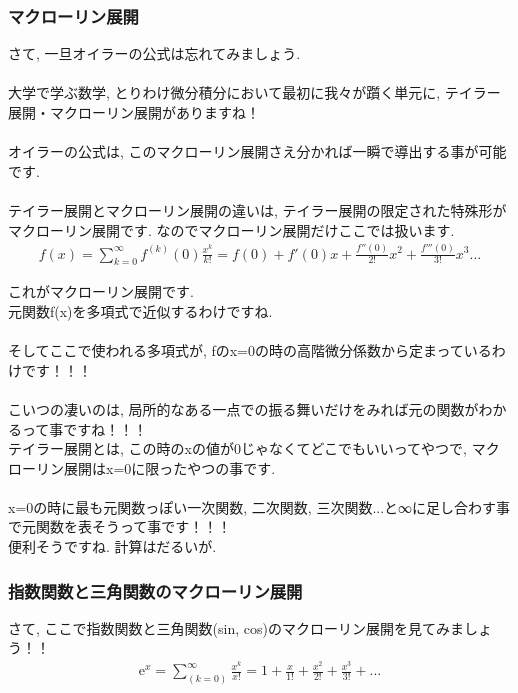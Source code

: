 \documentclass[11pt,a4paper]{jsarticle}
\begin{document}
\subsubsection{マクローリン展開}
さて, 一旦オイラーの公式は忘れてみましょう.\\
\\
大学で学ぶ数学, とりわけ微分積分において最初に我々が躓く単元に, テイラー展開・マクローリン展開がありますね！\\
\\
オイラーの公式は, このマクローリン展開さえ分かれば一瞬で導出する事が可能です.\\
\\
テイラー展開とマクローリン展開の違いは, テイラー展開の限定された特殊形がマクローリン展開です. なのでマクローリン展開だけここでは扱います.\\
\begin{eqnarray}
f(x) = \sum_{k=0}^\infty f^{(k)} (0) \frac{x^k}{k!} = f(0) + f'(0)x + \frac{f''(0)}{2!}x^2 + \frac{f'''(0)}{3!}x^3 ...
\end{eqnarray}

これがマクローリン展開です.\\
元関数f(x)を多項式で近似するわけですね.\\
\\
そしてここで使われる多項式が, fのx=0の時の高階微分係数から定まっているわけです！！！\\
\\
こいつの凄いのは, 局所的なある一点での振る舞いだけをみれば元の関数がわかるって事ですね！！！\\
テイラー展開とは, この時のxの値が0じゃなくてどこでもいいってやつで, マクローリン展開はx=0に限ったやつの事です.\\
\\
x=0の時に最も元関数っぽい一次関数, 二次関数, 三次関数...と∞に足し合わす事で元関数を表そうって事です！！！\\
便利そうですね. 計算はだるいが.\\
\subsubsection{指数関数と三角関数のマクローリン展開}
さて, ここで指数関数と三角関数(sin, cos)のマクローリン展開を見てみましょう！！\\

\begin{eqnarray}
\mathrm{e}^x = \sum_{(k=0)}^\infty \frac{x^k}{x!} = 1 + \frac{x}{1!} + \frac{x^2}{2!} + \frac{x^3}{3!} + ...
\label{eq:sisuu}
\end{eqnarray}
\end{document}
